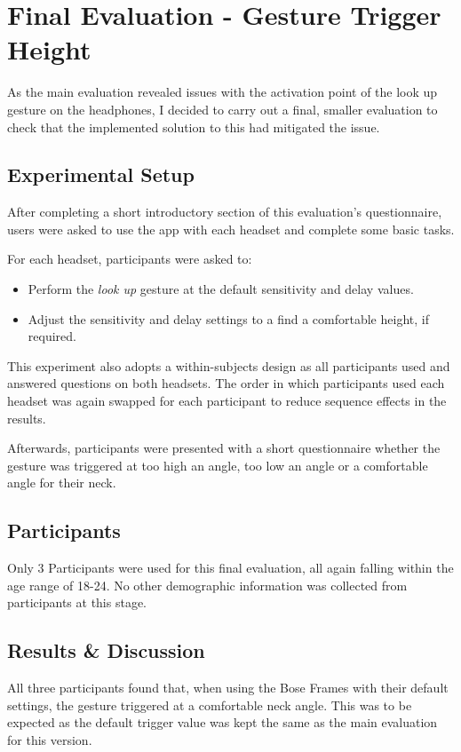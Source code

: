\documentclass{l4proj}
\begin{document}
\section{Final Evaluation - Gesture Trigger Height} \label{sec:final_eval}
As the main evaluation revealed issues with the activation point of the look up gesture on the headphones, I decided to carry out a final, smaller evaluation to check that the implemented solution to this had mitigated the issue.

\subsection{Experimental Setup}
After completing a short introductory section of this evaluation's questionnaire, users were asked to use the app with each headset and complete some basic tasks.

For each headset, participants were asked to: \begin{itemize}
    \item Perform the \emph{look up} gesture at the default sensitivity and delay values.
    \item Adjust the sensitivity and delay settings to a find a comfortable height, if required.
\end{itemize}
This experiment also adopts a within-subjects design as all participants used and answered questions on both headsets. The order in which participants used each headset was again swapped for each participant to reduce sequence effects in the results.

Afterwards, participants were presented with a short questionnaire whether the gesture was triggered at too high an angle, too low an angle or a comfortable angle for their neck.

\subsection{Participants}

Only 3 Participants were used for this final evaluation, all again falling within the age range of 18-24. No other demographic information was collected from participants at this stage.

\subsection{Results \& Discussion}

All three participants found that, when using the Bose Frames with their default settings, the gesture triggered at a comfortable neck angle. This was to be expected as the default trigger value was kept the same as the main evaluation for this version. 
\end{document}
